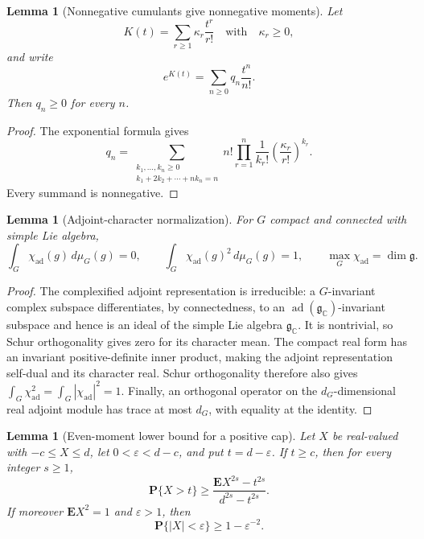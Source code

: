 \documentclass[11pt,reqno]{amsart}
\theoremstyle{plain}
\newtheorem{lemma}[theorem]{Lemma}
\theoremstyle{definition}
\newcommand{\chiad}{\chi_{\mathrm{ad}}}
\begin{document}
\begin{lemma}[Nonnegative cumulants give nonnegative moments]
\label{lem:nonnegative-cumulants}
Let
\[
 K(t)=\sum_{r\geq1}\kappa_r\frac{t^r}{r!}
 \quad\text{with}\quad \kappa_r\geq0,
\]
and write
\[
 e^{K(t)}=\sum_{n\geq0}q_n\frac{t^n}{n!}.
\]
Then $q_n\geq0$ for every $n$.
\end{lemma}

\begin{proof}
The exponential formula gives
\[
 q_n=\sum_{\substack{k_1,\ldots,k_n\geq0\\
                      k_1+2k_2+\cdots+nk_n=n}}
 n!\prod_{r=1}^{n}
 \frac1{k_r!}\left(\frac{\kappa_r}{r!}\right)^{k_r}.
\]
Every summand is nonnegative.
\end{proof}

\begin{lemma}[Adjoint-character normalization]\label{lem:adjoint-normalization}
For $G$ compact and connected with simple Lie algebra,
\[
 \int_G\chiad(g)\,d\mu_G(g)=0,
 \qquad
 \int_G\chiad(g)^2\,d\mu_G(g)=1,
 \qquad
 \max_G\chiad=\dim\mathfrak g.
\]
\end{lemma}

\begin{proof}
The complexified adjoint representation is irreducible: a
$G$-invariant complex subspace differentiates, by connectedness, to an
$\operatorname{ad}(\mathfrak g_{\mathbb C})$-invariant subspace and hence is
an ideal of the simple Lie algebra $\mathfrak g_{\mathbb C}$.  It is
nontrivial, so Schur orthogonality gives zero for its character mean.  The
compact real form has an invariant positive-definite inner product, making
the adjoint representation self-dual and its character real.  Schur
orthogonality therefore also gives
$\int_G\chiad^2=\int_G|\chiad|^2=1$.  Finally, an orthogonal operator on the
$d_G$-dimensional real adjoint module has trace at most $d_G$, with equality
at the identity.
\end{proof}

\begin{lemma}[Even-moment lower bound for a positive cap]
\label{lem:moment-cap-lower-bound}
Let $X$ be real-valued with $-c\leq X\leq d$, let
$0<\varepsilon<d-c$, and put $t=d-\varepsilon$.  If $t\geq c$, then for
every integer $s\geq1$,
\[
 \mathbf P\{X>t\}
 \geq
 \frac{\mathbf E X^{2s}-t^{2s}}{d^{2s}-t^{2s}}.
\]
If moreover $\mathbf E X^2=1$ and $\varepsilon>1$, then
\[
 \mathbf P\{|X|<\varepsilon\}\geq1-\varepsilon^{-2}.
\]
\end{lemma}
\end{document}
